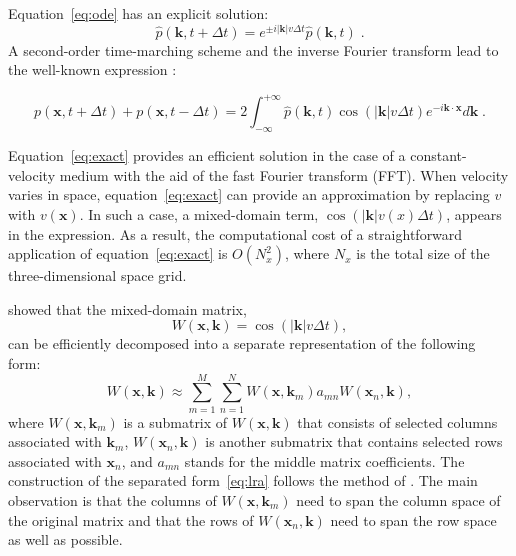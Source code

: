 Equation~\ref{eq:ode} has an explicit solution:
\begin{equation}
\label{eq:fourier} 
\hat{p}(\mathbf{k},t+\Delta t) = e^{\pm i|\mathbf{k}|v\Delta t}\hat{p}(\mathbf{k},t)\;.
\end{equation}
A second-order time-marching scheme and the inverse Fourier transform lead to 
the well-known expression \cite[]{etgen3,yu}:

\begin{equation}
\label{eq:exact} 
p(\mathbf{x},t+\Delta t)+p(\mathbf{x},t-\Delta t)  = 2\int^{+\infty}_{-\infty}{\hat{p}(\mathbf{k},t)\cos(|\mathbf{k}|v\Delta t)e^{-i\mathbf{k}\cdot\mathbf{x}}d\mathbf{k}}\;.
\end{equation} 

Equation~\ref{eq:exact} provides an efficient solution 
in the case of a constant-velocity medium with the aid of the fast Fourier transform (FFT). 
When velocity varies in space, 
equation~\ref{eq:exact} can provide an approximation by replacing $v$ with $v(\mathbf{x})$. 
In such a case, a mixed-domain term, $\cos(|\mathbf{k}|v(x)\Delta t)$, appears in the expression.
As a result, the computational cost of a straightforward application of equation~\ref{eq:exact} is $O(N_x^2)$, where $N_x$ is the total size of the three-dimensional space grid.

\cite{ying,lr} showed that the mixed-domain matrix,
\begin{equation}
\label{eq:mat}
W(\mathbf{x},\mathbf{k}) = \cos(|\mathbf{k}|v\Delta t),
\end{equation} 
can be efficiently decomposed into a separate representation of the following form:
\begin{equation}
  \label{eq:lra}
  W(\mathbf{x},\mathbf{k}) \approx \sum\limits_{m=1}^M \sum\limits_{n=1}^N W(\mathbf{x},\mathbf{k}_m) a_{mn} W(\mathbf{x}_n,\mathbf{k}),
\end{equation}
where $W(\mathbf{x},\mathbf{k}_m)$ is a submatrix of $W(\mathbf{x},\mathbf{k})$ that consists of 
selected columns associated with ${\mathbf{k}_m}$,
$W(\mathbf{x}_n,\mathbf{k})$ is another submatrix that contains 
selected rows associated with ${\mathbf{x}_n}$,
and $a_{mn}$ stands for the middle matrix coefficients.
The construction of the separated form~\ref{eq:lra} follows the method of \cite{eng2009}.
The main observation is that the columns of $W(\mathbf{x},\mathbf{k}_m)$ need to span the column space of the original matrix and that the rows of $W(\mathbf{x}_n,\mathbf{k})$ need to span the row space as well as possible.

